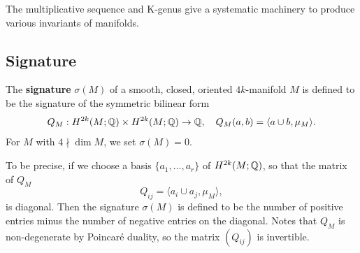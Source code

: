 \begin{remark}
    The multiplicative sequence and K-genus give a systematic machinery to produce various invariants of manifolds.
\end{remark}

\subsection{Signature}
\begin{definition}
    The \textbf{signature} $\sigma(M)$ of a smooth, closed, oriented $4k$-manifold $M$ is defined to be the signature of the symmetric bilinear form
    \begin{equation*}
        Q_M : H^{2k}(M;\mathbb{Q}) \times H^{2k}(M;\mathbb{Q}) \to \mathbb{Q}, \quad Q_M(a,b) = \langle a \cup b, \mu_M \rangle.
    \end{equation*}
    For $M$ with $4\nmid \dim M$, we set $\sigma(M) = 0$.
\end{definition}
To be precise, if we choose a basis $\{a_1,\dots,a_r\}$ of $H^{2k}(M;\mathbb{Q})$, so that the matrix of $Q_M$
\begin{equation*}
    Q_{ij} = \langle a_i \cup a_j, \mu_M \rangle,
\end{equation*}
is diagonal. Then the signature $\sigma(M)$ is defined to be the number of positive entries minus the number of negative entries on the diagonal. 
Notes that $Q_M$ is non-degenerate by Poincar\'e duality, so the matrix $(Q_{ij})$ is invertible. 

